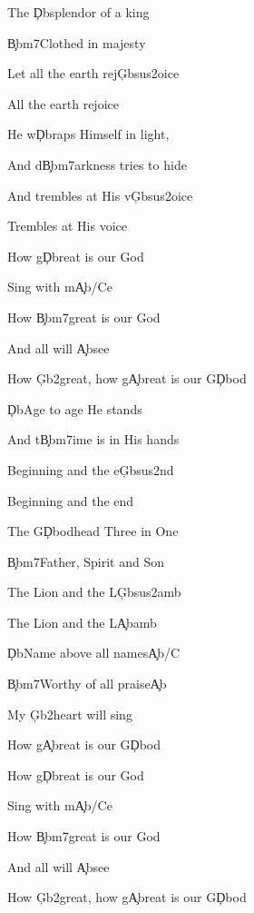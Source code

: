 \documentclass[9pt]{extarticle}
\begin{document}
\bsong

\bv
The \c{Db}splendor of a king

\c{Bbm7}Clothed in majesty

Let all the earth rej\c{Gbsus2}oice

All the earth rejoice
\ev

\bv
He w\c{Db}raps Himself in light,

And d\c{Bbm7}arkness tries to hide

And trembles at His v\c{Gbsus2}oice

Trembles at His voice
\ev

\bc
How g\c{Db}reat is our God

Sing with m\c{Ab/C}e

How \c{Bbm7}great is our God

And all will \c{Ab}see

How \c{Gb2}great, how g\c{Ab}reat is our G\c{Db}od
\ec

\bv
\c{Db}Age to age He stands

And t\c{Bbm7}ime is in His hands

Beginning and the e\c{Gbsus2}nd

Beginning and the end
\ev

\bv
The G\c{Db}odhead Three in One

\c{Bbm7}Father, Spirit and Son

The Lion and the L\c{Gbsus2}amb

The Lion and the L\c{Ab}amb
\ev


\bb[2]
\c{Db}Name above all names\c{Ab/C}

\c{Bbm7}Worthy of all praise\c{Ab}

My \c{Gb2}heart will sing

How g\c{Ab}reat is our G\c{Db}od
\eb


\bo
How g\c{Db}reat is our God

Sing with m\c{Ab/C}e

How \c{Bbm7}great is our God

And all will \c{Ab}see

How \c{Gb2}great, how g\c{Ab}reat is our G\c{Db}od
\eo

\esong
\end{document}
